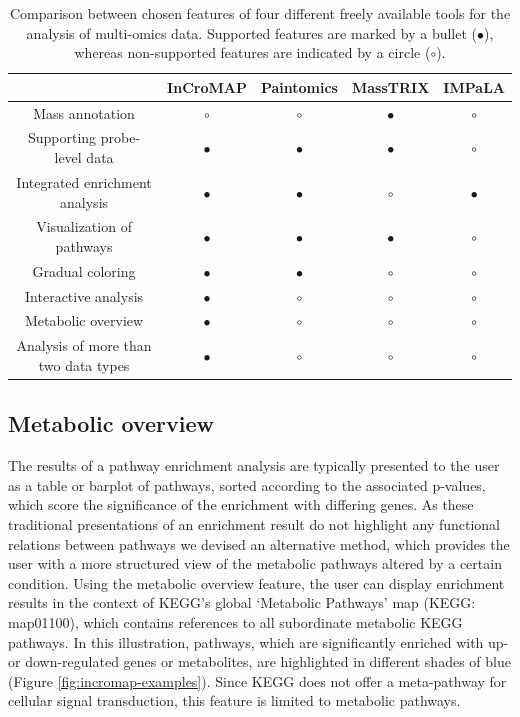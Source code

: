\documentclass[final,5p,times,twocolumn]{elsarticle}
\newcommand\red[1]{{\color{red}#1}}
\begin{document}
\begin{table}
\center
\caption{\red{Comparison between chosen features of four different freely available tools for the analysis of multi-omics data. Supported features are marked by a bullet ($\bullet$), whereas non-supported features are indicated by a circle ($\circ$).}}
\begin{tabular}{ccccc}
\hline
 & InCroMAP & Paintomics & MassTRIX & IMPaLA\\
\hline
Mass annotation & $\circ$ & $\circ$ & $\bullet$ & $\circ$ \\
Supporting probe-level data & $\bullet$  & $\bullet$  & $\bullet$  & $\circ$ \\
Integrated enrichment analysis & $\bullet$  & $\bullet$ & $\circ$  & $\bullet$  \\
Visualization of pathways & $\bullet$ & $\bullet$ & $\bullet$  & $\circ$\\
Gradual coloring & $\bullet$  & $\bullet$ & $\circ$ & $\circ$\\
Interactive analysis & $\bullet$  & $\circ$ & $\circ$ & $\circ$\\
Metabolic overview  & $\bullet$  & $\circ$ & $\circ$ & $\circ$\\
Analysis of more than two data types & $\bullet$  & $\circ$ & $\circ$ & $\circ$ \\
\hline
\end{tabular}
\label{tab:incromap-comparison}
\end{table}

\subsection{Metabolic overview}
The results of a pathway enrichment analysis are typically presented to the user as a table or barplot of pathways, sorted according to the associated p-values, which score the significance of the enrichment with differing genes. As these traditional presentations of an enrichment result do not highlight any functional relations between pathways we devised an alternative method, which provides the user with a more structured view of the metabolic pathways altered by a certain condition. Using the metabolic overview feature, the user can display enrichment results in the context of KEGG's global `Metabolic Pathways' map (KEGG: map01100), which contains references to all subordinate metabolic KEGG pathways. In this illustration, pathways, which are significantly enriched with up- or down-regulated genes or metabolites, are highlighted in different shades of blue (Figure \ref{fig:incromap-examples}). Since KEGG does not offer a meta-pathway for cellular signal transduction, this feature is limited to metabolic 
pathways. 
\end{document}
